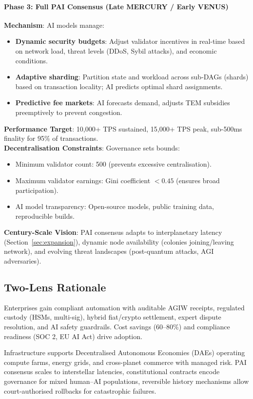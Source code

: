 \documentclass[11pt]{article}
\begin{document}
\paragraph{Phase 3: Full PAI Consensus (Late MERCURY / Early VENUS)}
\textbf{Mechanism}: AI models manage:
\begin{itemize}[noitemsep]
  \item \textbf{Dynamic security budgets}: Adjust validator incentives in real-time based on network load, threat levels (DDoS, Sybil attacks), and economic conditions.
  \item \textbf{Adaptive sharding}: Partition state and workload across sub-DAGs (shards) based on transaction locality; AI predicts optimal shard assignments.
  \item \textbf{Predictive fee markets}: AI forecasts demand, adjusts TEM subsidies preemptively to prevent congestion.
\end{itemize}
\textbf{Performance Target}: 10,000+ TPS sustained, 15,000+ TPS peak, sub-500ms finality for 95\% of transactions.\\
\textbf{Decentralisation Constraints}: Governance sets bounds:
\begin{itemize}[noitemsep]
  \item Minimum validator count: 500 (prevents excessive centralisation).
  \item Maximum validator earnings: Gini coefficient $<0.45$ (ensures broad participation).
  \item AI model transparency: Open-source models, public training data, reproducible builds.
\end{itemize}
\textbf{Century-Scale Vision}: PAI consensus adapts to interplanetary latency (Section~\ref{sec:expansion}), dynamic node availability (colonies joining/leaving network), and evolving threat landscapes (post-quantum attacks, AGI adversaries).

\subsection{Two-Lens Rationale}
\begin{description}[style=nextline]
  \item[Near-Term (MERCURY Era)] Enterprises gain compliant automation with auditable AGIW receipts, regulated custody (HSMs, multi-sig), hybrid fiat/crypto settlement, expert dispute resolution, and AI safety guardrails. Cost savings (60--80\%) and compliance readiness (SOC 2, EU AI Act) drive adoption.
  \item[Century-Scale (VENUS through ANDROMEDA)] Infrastructure supports Decentralised Autonomous Economies (DAEs) operating compute farms, energy grids, and cross-planet commerce with managed risk. PAI consensus scales to interstellar latencies, constitutional contracts encode governance for mixed human--AI populations, reversible history mechanisms allow court-authorised rollbacks for catastrophic failures.
\end{description}
\end{document}
